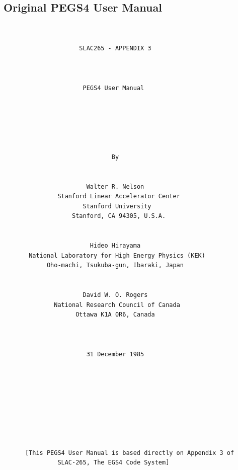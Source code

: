 \newpage
\subsection{Original PEGS4 User Manual}
\begin{verbatim}


                     SLAC265 - APPENDIX 3



                      PEGS4 User Manual






                              By


                       Walter R. Nelson
               Stanford Linear Accelerator Center
                      Stanford University
                   Stanford, CA 94305, U.S.A.


                        Hideo Hirayama
       National Laboratory for High Energy Physics (KEK)
            Oho-machi, Tsukuba-gun, Ibaraki, Japan


                      David W. O. Rogers
              National Research Council of Canada
                    Ottawa K1A 0R6, Canada



                       31 December 1985









      [This PEGS4 User Manual is based directly on Appendix 3 of
               SLAC-265, The EGS4 Code System]
\end{verbatim}



